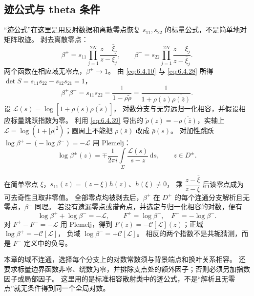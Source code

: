 \documentclass[lang=cn,scheme=chinese,mode=simple,device=normal,color=blue,
math=cm,thmcnt=section,12pt]{elegantbook}
\newcommand{\dd}{\,\mathrm{d}}
\newcommand{\conj}[1]{\overline{#1}}
\newcommand{\eqq}[2]{\tag{#1}\label{eq:#1}#2}
\begin{document}
\subsection{迹公式与 theta 条件}
“迹公式”在这里是用反射数据和离散零点恢复 $s_{11},s_{22}$ 的标量公式，不是简单地对矩阵取迹。
剥去离散零点：
\begin{equation}\eqq{6.7.7}{\beta^+=s_{11}\prod\limits_{j=1}^{2N}\dfrac{z-\bar\xi_j}{z-\xi_j},\qquad
        \beta^-=s_{22}\prod\limits_{j=1}^{2N}\dfrac{z-\xi_j}{z-\bar\xi_j}.}\end{equation}
两个函数在相应域无零点，$\beta^\pm\to1$。
由 \eqref{eq:6.4.10} 与 \eqref{eq:6.4.28} 所得 $\det S=s_{11}s_{22}-s_{12}s_{21}=1$，
\[
    \beta^+\beta^-=s_{11}s_{22}=\dfrac{1}{1-\rho\widetilde\rho}
    =\dfrac{1}{1+\rho(z)\conj{\rho(\bar z)}}.
\]
设 $\mathcal L(s)=\log[1+\rho(s)\conj{\rho(\bar s)}]$，
对数分支与无穷远归一化相容，并假设相应标量跳跃指数为零。
利用 \eqref{eq:6.4.39} 导出的 $\widetilde\rho(z)=-\overline{\rho(\bar z)}$，实轴上 $\mathcal L=\log(1+|\rho|^2)$；圆周上不能把 $\conj{\rho(\bar s)}$ 改成 $\bar\rho(s)$。
对加性跳跃 $\log\beta^+-(-\log\beta^-)=-\mathcal L$ 用 Plemelj：
\begin{equation}\eqq{6.7.8}{\log\beta^\pm(z)=\mp\dfrac{1}{2\pi i}
        \int\limits_\Sigma\dfrac{\mathcal L(s)}{s-z}\dd s,\qquad z\in D^\pm.}\end{equation}

\begin{callout}
    在简单零点 $\xi$，$s_{11}(z)=(z-\xi)h(z)$、$h(\xi)\ne0$，
    乘 $\dfrac{z-\bar\xi}{z-\xi}$ 后该零点成为可去奇性且取非零值。
    全部零点均被剥去后，$\beta^+$ 在 $D^+$ 的每个连通分支解析且无零点，$\beta^-$ 同理。
    若没有遗漏零点或谱奇点，并选定与归一化相容的对数，便有
    \[
        \log\beta^++\log\beta^-=-\mathcal L,\qquad
        F^+=\log\beta^+,\quad F^-=-\log\beta^-.
    \]
    对 $F^+-F^-=-\mathcal L$ 用 Plemelj，得到
    $F(z)=-\mathcal C[\mathcal L](z)$；正域 $\log\beta^+=-\mathcal C[\mathcal L]$，
    负域 $\log\beta^-=+\mathcal C[\mathcal L]$。
    相反的两个指数不是共轭猜测，而是 $F^-$ 定义中的负号。

    本章的域不连通，选择每个分支上的对数常数须与背景端点和换叶关系相容。
    还要求标量边界函数非零、绕数为零，并排除支点处的额外因子；否则必须另加指数因子或局部因子。
    这里用的是标准相容散射类中的迹公式，不是“解析且无零点”就无条件得到同一个全局对数。
\end{callout}
\end{document}
